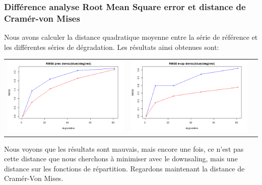 \documentclass[a4paper,10pt]{article}
\begin{document}
\subsubsection{Différence analyse Root Mean Square error et distance de Cramér-von Mises}

Nous avons calculer la distance quadratique moyenne entre la série de référence et les différentes séries de dégradation. Les résultats ainsi obtenues sont:

\vspace{0.5cm}

\hspace{-1cm}
\begin{tabular}{ccc}
	\includegraphics[scale=0.4]{images/RMSE_precip.png} & \includegraphics[scale=0.4]{images/RMSE_evap.png}  \\
\end{tabular} 

Nous voyons que les résultats sont mauvais, mais encore une fois, ce n'est pas cette distance que nous cherchons à minimiser avec le downsaling, mais une distance sur les fonctions de répartition. Regardons maintenant la distance de Cramér-Von Mises.
\end{document}
